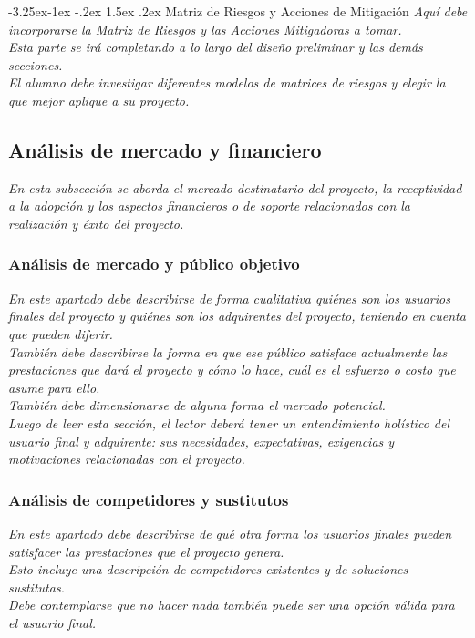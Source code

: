 \documentclass[12pt]{article}
\makeatletter
\renewcommand\paragraph{\@startsection{paragraph}{4}{\z@}%
                                     {-3.25ex\@plus -1ex \@minus -.2ex}%
                                     {1.5ex \@plus .2ex}%
                                     {\normalfont\normalsize\bfseries}}
\makeatother
\begin{document}
    \paragraph{Matriz de Riesgos y Acciones de Mitigación}
    {\it
    Aquí debe incorporarse la Matriz de Riesgos y las Acciones Mitigadoras a tomar.\\
    Esta parte se irá completando a lo largo del diseño preliminar y las demás secciones.\\
    El alumno debe investigar diferentes modelos de matrices de riesgos y elegir la que mejor aplique a su proyecto.
    }

\subsection{Análisis de mercado y financiero}
{\it
En esta subsección se aborda el mercado destinatario del proyecto, la receptividad a la adopción y los aspectos financieros o de soporte relacionados con la realización y éxito del proyecto.
}

\subsubsection{Análisis de mercado y público objetivo}
{\it
En este apartado debe describirse de forma cualitativa quiénes son los usuarios finales del proyecto y quiénes son los adquirentes del proyecto, teniendo en cuenta que pueden diferir.\\
También debe describirse la forma en que ese público satisface actualmente las prestaciones que dará el proyecto y cómo lo hace, cuál es el esfuerzo o costo que asume para ello.\\
También debe dimensionarse de alguna forma el mercado potencial.\\
Luego de leer esta sección, el lector deberá tener un entendimiento holístico del usuario final y adquirente: sus necesidades, expectativas, exigencias y motivaciones relacionadas con el proyecto.
}

\subsubsection{Análisis de competidores y sustitutos}
{\it
En este apartado debe describirse de qué otra forma los usuarios finales pueden satisfacer las prestaciones que el proyecto genera.\\
Esto incluye una descripción de competidores existentes y de soluciones sustitutas.\\
Debe contemplarse que no hacer nada también puede ser una opción válida para el usuario final.
}
\end{document}
